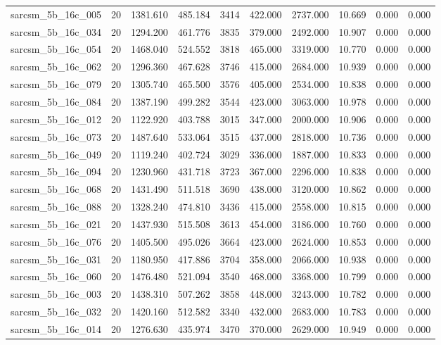 \begin{tabular}{lrrrrrrrrr}
sarcsm\_5b\_16c\_005 & 20 & 1381.610 & 485.184 & 3414 & 422.000 & 2737.000 & 10.669 & 0.000 & 0.000 \\
sarcsm\_5b\_16c\_034 & 20 & 1294.200 & 461.776 & 3835 & 379.000 & 2492.000 & 10.907 & 0.000 & 0.000 \\
sarcsm\_5b\_16c\_054 & 20 & 1468.040 & 524.552 & 3818 & 465.000 & 3319.000 & 10.770 & 0.000 & 0.000 \\
sarcsm\_5b\_16c\_062 & 20 & 1296.360 & 467.628 & 3746 & 415.000 & 2684.000 & 10.939 & 0.000 & 0.000 \\
sarcsm\_5b\_16c\_079 & 20 & 1305.740 & 465.500 & 3576 & 405.000 & 2534.000 & 10.838 & 0.000 & 0.000 \\
sarcsm\_5b\_16c\_084 & 20 & 1387.190 & 499.282 & 3544 & 423.000 & 3063.000 & 10.978 & 0.000 & 0.000 \\
sarcsm\_5b\_16c\_012 & 20 & 1122.920 & 403.788 & 3015 & 347.000 & 2000.000 & 10.906 & 0.000 & 0.000 \\
sarcsm\_5b\_16c\_073 & 20 & 1487.640 & 533.064 & 3515 & 437.000 & 2818.000 & 10.736 & 0.000 & 0.000 \\
sarcsm\_5b\_16c\_049 & 20 & 1119.240 & 402.724 & 3029 & 336.000 & 1887.000 & 10.833 & 0.000 & 0.000 \\
sarcsm\_5b\_16c\_094 & 20 & 1230.960 & 431.718 & 3723 & 367.000 & 2296.000 & 10.838 & 0.000 & 0.000 \\
sarcsm\_5b\_16c\_068 & 20 & 1431.490 & 511.518 & 3690 & 438.000 & 3120.000 & 10.862 & 0.000 & 0.000 \\
sarcsm\_5b\_16c\_088 & 20 & 1328.240 & 474.810 & 3436 & 415.000 & 2558.000 & 10.815 & 0.000 & 0.000 \\
sarcsm\_5b\_16c\_021 & 20 & 1437.930 & 515.508 & 3613 & 454.000 & 3186.000 & 10.760 & 0.000 & 0.000 \\
sarcsm\_5b\_16c\_076 & 20 & 1405.500 & 495.026 & 3664 & 423.000 & 2624.000 & 10.853 & 0.000 & 0.000 \\
sarcsm\_5b\_16c\_031 & 20 & 1180.950 & 417.886 & 3704 & 358.000 & 2066.000 & 10.938 & 0.000 & 0.000 \\
sarcsm\_5b\_16c\_060 & 20 & 1476.480 & 521.094 & 3540 & 468.000 & 3368.000 & 10.799 & 0.000 & 0.000 \\
sarcsm\_5b\_16c\_003 & 20 & 1438.310 & 507.262 & 3858 & 448.000 & 3243.000 & 10.782 & 0.000 & 0.000 \\
sarcsm\_5b\_16c\_032 & 20 & 1420.160 & 512.582 & 3340 & 432.000 & 2683.000 & 10.783 & 0.000 & 0.000 \\
sarcsm\_5b\_16c\_014 & 20 & 1276.630 & 435.974 & 3470 & 370.000 & 2629.000 & 10.949 & 0.000 & 0.000 \\

\end{tabular}

